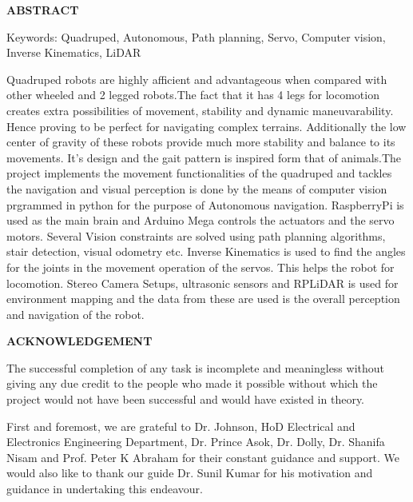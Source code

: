 \documentclass[12pt,a4paper]{report}
\begin{document}
\newpage
\begin{center}
     \Large  \textbf{ABSTRACT}\\
     \vspace{0.5cm}
    
\end{center}
Keywords: Quadruped, Autonomous, Path planning, Servo, Computer vision, Inverse Kinematics, LiDAR\\
\vspace{0.5cm}

Quadruped robots are highly afficient and advantageous when compared with other wheeled and 2 legged robots.The fact that it has 4 legs for locomotion creates extra possibilities of movement, stability and dynamic maneuvarability. Hence proving to be perfect for navigating complex terrains. Additionally the low center of gravity of these robots provide much more stability and balance to its movements. It's design and the gait pattern is inspired form that of animals.The project implements the movement functionalities of the quadruped and tackles the navigation and visual perception is done by the means of computer vision prgrammed in python for the purpose of Autonomous navigation. RaspberryPi is used as the main brain and Arduino Mega controls the actuators and the servo motors. Several Vision constraints are solved using path planning algorithms, stair detection, visual odometry etc. Inverse Kinematics is used to find the angles for the joints in the movement operation of the servos. This helps the robot for locomotion. Stereo Camera Setups, ultrasonic sensors and RPLiDAR is used for environment mapping and the data from these are used is the overall perception and navigation of the robot.


\newpage
\begin{center}
     \Large  \textbf{ACKNOWLEDGEMENT}\\
\end{center}
     \vspace{0.5cm}
     
     The successful completion of any task is incomplete and meaningless without giving any due credit to the people who made it possible without which the project would not have been successful and would have existed in theory.
     
     First and foremost, we are grateful to Dr. Johnson, HoD Electrical and Electronics Engineering Department, Dr. Prince Asok, Dr. Dolly, Dr. Shanifa Nisam and Prof. Peter K Abraham for their constant guidance and support. We would also like to thank our guide Dr. Sunil Kumar for his motivation and guidance in undertaking this endeavour.
     
\end{document}
